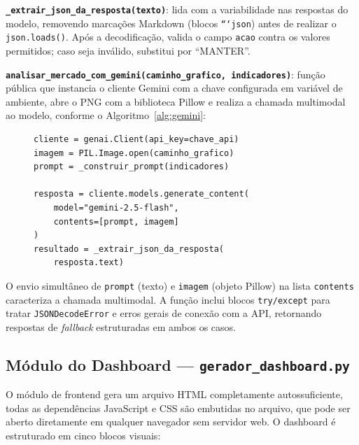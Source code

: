 \documentclass[conference]{IEEEtran}
\begin{document}
\textbf{\texttt{\_extrair\_json\_da\_resposta(texto)}}: lida com a variabilidade nas respostas do modelo, removendo marcações Markdown (blocos \texttt{```json}) antes de realizar o \texttt{json.loads()}. Após a decodificação, valida o campo \texttt{acao} contra os valores permitidos; caso seja inválido, substitui por ``MANTER''.

\textbf{\texttt{analisar\_mercado\_com\_gemini(caminho\_grafico, indicadores)}}: função pública que instancia o cliente Gemini com a chave configurada em variável de ambiente, abre o PNG com a biblioteca Pillow e realiza a chamada multimodal ao modelo, conforme o Algoritmo~\ref{alg:gemini}:

\begin{figure}[H]
\begin{lstlisting}[caption={Chamada multimodal ao modelo Gemini.}, label={alg:gemini}]
cliente = genai.Client(api_key=chave_api)
imagem = PIL.Image.open(caminho_grafico)
prompt = _construir_prompt(indicadores)

resposta = cliente.models.generate_content(
    model="gemini-2.5-flash",
    contents=[prompt, imagem]
)
resultado = _extrair_json_da_resposta(
    resposta.text)
\end{lstlisting}
\end{figure}

O envio simultâneo de \texttt{prompt} (texto) e \texttt{imagem} (objeto Pillow) na lista \texttt{contents} caracteriza a chamada multimodal. A função inclui blocos \texttt{try/except} para tratar \texttt{JSONDecodeError} e erros gerais de conexão com a API, retornando respostas de \textit{fallback} estruturadas em ambos os casos.

\subsection{Módulo do Dashboard — \texttt{gerador\_dashboard.py}}

O módulo de frontend gera um arquivo HTML completamente autossuficiente, todas as dependências JavaScript e CSS são embutidas no arquivo, que pode ser aberto diretamente em qualquer navegador sem servidor web. O dashboard é estruturado em cinco blocos visuais:
\end{document}
